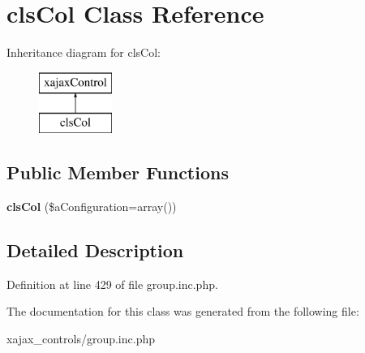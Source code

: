 \hypertarget{classclsCol}{
\section{clsCol Class Reference}
\label{classclsCol}
}
Inheritance diagram for clsCol:\begin{figure}[H]
\begin{center}
\leavevmode
\includegraphics[height=2.000000cm]{classclsCol}
\end{center}
\end{figure}
\subsection*{Public Member Functions}
\begin{DoxyCompactItemize}
\item 
\hypertarget{classclsCol_a98d216704230af20a7282fc28028a8d4}{
{\bfseries clsCol} (\$aConfiguration=array())}
\label{classclsCol_a98d216704230af20a7282fc28028a8d4}

\end{DoxyCompactItemize}


\subsection{Detailed Description}


Definition at line 429 of file group.inc.php.



The documentation for this class was generated from the following file:\begin{DoxyCompactItemize}
\item 
xajax\_\-controls/group.inc.php\end{DoxyCompactItemize}
